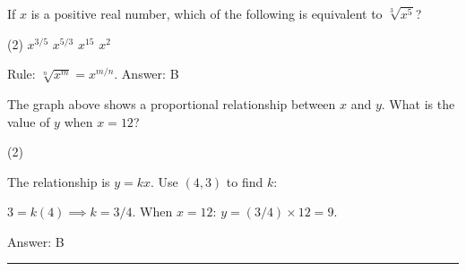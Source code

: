 \documentclass[11pt,paper=a4,answers]{exam}
\begin{document}
\begin{questions}
\question
If $x$ is a positive real number, which of the following is equivalent to $\sqrt[3]{x^5}$?
\begin{tasks}(2)
    \task $x^{3/5}$ \task $x^{5/3}$ \task $x^{15}$ \task $x^{2}$
\end{tasks}

\begin{solution}
Rule: $\sqrt[n]{x^m} = x^{m/n}$.
\vspace{5pt}
Answer: \colorbox{yellow!100}{B}
\end{solution}

\vspace{1cm}

\question
\begin{center}
\end{center}
The graph above shows a proportional relationship between $x$ and $y$. What is the value of $y$ when $x = 12$?
\begin{tasks}(2)
       
\end{tasks}

\begin{solution}
The relationship is $y = kx$. Use $(4, 3)$ to find $k$:
\vspace{5pt}
\begin{center}
$3 = k(4) \implies k = 3/4$.
\vspace{5pt}
When $x = 12$: $y = (3/4) \times 12 = 9$.
\end{center}
\vspace{5pt}
Answer: \colorbox{yellow!100}{B}
\end{solution}

\end{questions}
\begin{center}
\rule{.5\textwidth}{1pt}
\end{center}
\end{document}
